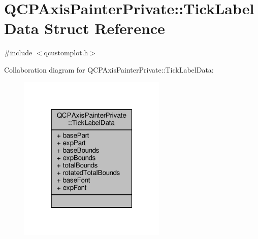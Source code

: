 \hypertarget{struct_q_c_p_axis_painter_private_1_1_tick_label_data}{}\section{Q\+C\+P\+Axis\+Painter\+Private\+:\+:Tick\+Label\+Data Struct Reference}
\label{struct_q_c_p_axis_painter_private_1_1_tick_label_data}


{\ttfamily \#include $<$qcustomplot.\+h$>$}



Collaboration diagram for Q\+C\+P\+Axis\+Painter\+Private\+:\+:Tick\+Label\+Data\+:\nopagebreak
\begin{figure}[H]
\begin{center}
\leavevmode
\includegraphics[width=199pt]{struct_q_c_p_axis_painter_private_1_1_tick_label_data__coll__graph}
\end{center}
\end{figure}
